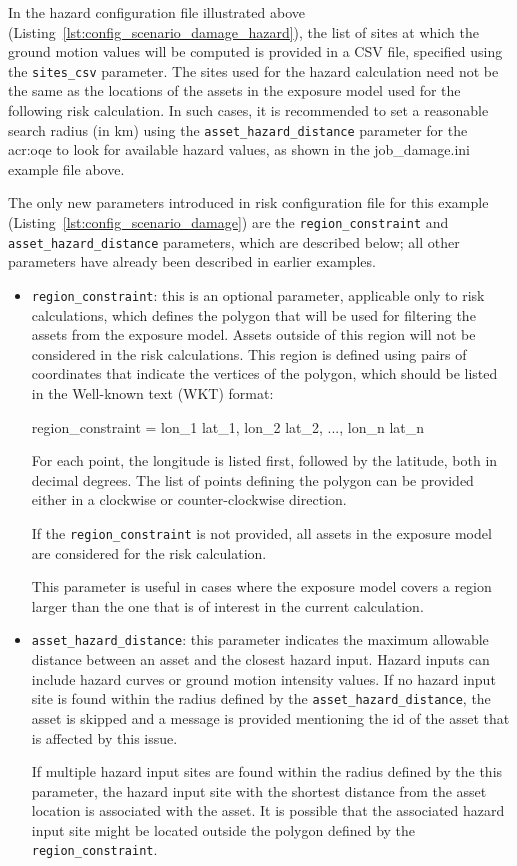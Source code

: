 In the hazard configuration file illustrated above
(Listing~\ref{lst:config_scenario_damage_hazard}), the list of sites at which
the ground motion values will be computed is provided in a CSV file, specified
using the \Verb+sites_csv+ parameter. The sites used for the hazard
calculation need not be the same as the locations of the assets in the
exposure model used for the following risk calculation. In such cases, it is
recommended to set a reasonable search radius (in km) using the
\Verb+asset_hazard_distance+ parameter for the \glsdesc{acr:oqe} to look for
available hazard values, as shown in the job\_damage.ini example file above.

The only new parameters introduced in risk configuration file for this example
(Listing~\ref{lst:config_scenario_damage}) are the \Verb+region_constraint+
and \Verb+asset_hazard_distance+ parameters, which are described below; all
other parameters have already been described in earlier examples.

\begin{itemize}

  \item \Verb+region_constraint+: this is an optional parameter, applicable
    only to risk calculations, which defines the polygon that will be used for
    filtering the assets from the exposure model. Assets outside of this region
    will not be considered in the risk calculations. This region is defined
    using pairs of coordinates that indicate the vertices of the polygon, which
    should be listed in the Well-known text (WKT) format:

    region\_constraint = lon\_1 lat\_1, lon\_2 lat\_2, ..., lon\_n lat\_n

    For each point, the longitude is listed first, followed by the latitude,
    both in decimal degrees. The list of points defining the polygon can be
    provided either in a clockwise or counter-clockwise direction.

    If the \Verb+region_constraint+ is not provided, all assets in the exposure
    model are considered for the risk calculation.

    This parameter is useful in cases where the exposure model covers a region
    larger than the one that is of interest in the current calculation.

  \item \Verb+asset_hazard_distance+: this parameter indicates the maximum
    allowable distance between an \gls{asset} and the closest hazard input.
    Hazard inputs can include hazard curves or ground motion intensity values.
    If no hazard input site is found within the radius defined by the
    \Verb+asset_hazard_distance+, the asset is skipped and a message is
    provided mentioning the id of the asset that is affected by this issue.

    If multiple hazard input sites are found within the radius defined by the
    this parameter, the hazard input site with the shortest distance from the
    asset location is associated with the asset. It is possible that the
    associated hazard input site might be located outside the polygon defined
    by the \Verb+region_constraint+.

\end{itemize}


